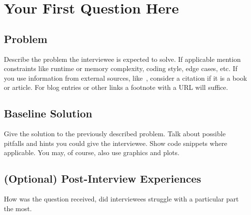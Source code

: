 \section{Your First Question Here}

\subsection{Problem}

Describe the problem the interviewee is expected to solve. If applicable
mention constraints like runtime or memory complexity, coding style, edge
cases, etc. If you use information from external sources,
like~\cite{McDowell_Cracking_2015}, consider a citation if it is a book or
article. For blog entries or other links a footnote with a URL will suffice.

\subsection{Baseline Solution}

Give the solution to the previously described problem. Talk about possible
pitfalls and hints you could give the interviewee. Show code snippets where
applicable. You may, of course, also use graphics and plots.

\subsection{(Optional) Post-Interview Experiences}

How was the question received, did interviewees struggle with a particular part
the most.
